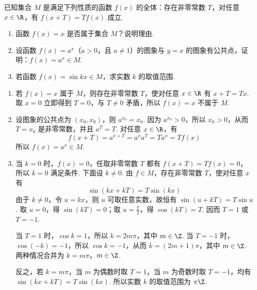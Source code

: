 \begin{problem}
已知集合 \(M\) 是满足下列性质的函数 \(f(x)\) 的全体：存在非零常数 \(T\)，对任意 \(x \in \R\)，有 \(f(x + T) = Tf(x)\) 成立.

\begin{enumerate}
\item 函数 \(f(x) = x\) 是否属于集合 \(M\)？说明理由.
\item 设函数 \(f(x) = a^x\)（\(a > 0\)，且 \(a \neq 1\)）的图象与 \(y = x\) 的图象有公共点，证明：\(f(x) = a^x \in M\).
\item 若函数 \(f(x) = \sin kx \in M\)，求实数 \(k\) 的取值范围.
\end{enumerate}
\end{problem}

\begin{solution}
\begin{enumerate}
\item 若 \(f(x)=x\) 属于 \(M\)，则存在非零常数 \(T\)，使对任意 \(x\in\R\) 有 \(x+T=Tx\). 取 \(x=0\) 立即得到 \(T=0\)，与 \(T\neq0\) 矛盾，所以 \(f(x)=x\) 不属于 \(M\).
\item 设图象的公共点为 \((x_0,x_0)\)，则 \(a^{x_0}=x_0\). 因为 \(a^{x_0}>0\)，所以 \(x_0>0\)，从而 \(T=x_0\) 是非零常数，并且 \(a^T=T\). 对任意 \(x\in\R\)，有
\[
f(x+T)=a^{x+T}=a^x a^T=T a^x=Tf(x)
\]
所以 \(f(x)=a^x\in M\).
\item 当 \(k=0\) 时，\(f(x)=0\)，任取非零常数 \(T\) 都有 \(f(x+T)=Tf(x)=0\)，所以 \(k=0\) 满足条件. 下面设 \(k\neq0\). 由 \(f\in M\)，存在非零常数 \(T\)，使对任意 \(x\) 有
\[
\sin(kx+kT)=T\sin(kx)
\]
由于 \(k\neq0\)，令 \(u=kx\)，则 \(u\) 可取任意实数，故恒有 \(\sin(u+kT)=T\sin u\). 取 \(u=0\)，得 \(\sin(kT)=0\)；取 \(u=\frac\pi2\)，得 \(\cos(kT)=T\). 因而 \(T=1\) 或 \(T=-1\).

当 \(T=1\) 时，\(\cos k=1\)，所以 \(k=2m\pi\)，其中 \(m\in\Z\). 当 \(T=-1\) 时，\(\cos(-k)=-1\)，所以 \(\cos k=-1\)，从而 \(k=(2m+1)\pi\)，其中 \(m\in\Z\). 两种情况合并为 \(k=m\pi\)，\(m\in\Z\).

反之，若 \(k=m\pi\)，当 \(m\) 为偶数时取 \(T=1\)，当 \(m\) 为奇数时取 \(T=-1\)，均有 \(\sin(kx+kT)=T\sin(kx)\). 所以实数 \(k\) 的取值范围为 \(\pi\Z\).
\end{enumerate}
\end{solution}

